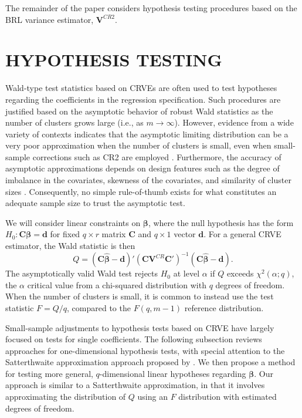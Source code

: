 \documentclass[12pt]{article}\usepackage[]{graphicx}\usepackage[]{color}
\newcommand{\bm}{\mathbf}
\newcommand{\bs}{\boldsymbol}
\begin{document}
The remainder of the paper considers hypothesis testing procedures based on the BRL variance estimator, $\bm{V}^{CR2}$. 


\section{HYPOTHESIS TESTING}
\label{sec:testing}

Wald-type test statistics based on CRVEs are often used to test hypotheses regarding the coefficients in the regression specification. 
Such procedures are justified based on the asymptotic behavior of robust Wald statistics as the number of clusters grows large (i.e., as $m \to \infty$). 
However, evidence from a wide variety of contexts indicates that the asymptotic limiting distribution can be a very poor approximation when the number of clusters is small, even when small-sample corrections such as CR2 are employed \citep{Bell2002bias, Bertrand2004how, Cameron2008bootstrap}. 
Furthermore, the accuracy of asymptotic approximations depends on design features such as the degree of imbalance in the covariates, skewness of the covariates, and similarity of cluster sizes \citep{McCaffrey2001generalizations, Tipton2015small, Webb2013wild}. 
Consequently, no simple rule-of-thumb exists for what constitutes an adequate sample size to trust the asymptotic test. 

We will consider linear constraints on $\bs\beta$, where the null hypothesis has the form $H_0: \bm{C}\bs\beta = \bm{d}$ for fixed $q \times r$ matrix $\bm{C}$ and $q \times 1$ vector $\bm{d}$. 
For a general CRVE estimator, the Wald statistic  is then
\begin{equation}
\label{eq:Wald_stat}
Q = \left(\bm{C}\bs{\hat\beta} - \bm{d}\right)'\left(\bm{C} \bm{V}^{CR} \bm{C}'\right)^{-1}\left(\bm{C}\bs{\hat\beta} - \bm{d}\right).
\end{equation}
The asymptotically valid Wald test rejects $H_0$ at level $\alpha$ if $Q$ exceeds $\chi^2(\alpha; q)$, the $\alpha$ critical value from a chi-squared distribution with $q$ degrees of freedom.  
When the number of clusters is small, it is common to instead use the test statistic $F = Q/q$, compared to the $F(q, m - 1)$ reference distribution. 

Small-sample adjustments to hypothesis tests based on CRVE have largely focused on tests for single coefficients. The following subsection reviews approaches for one-dimensional hypothesis tests, with special attention to the Satterthwaite approximation approach proposed by \citet{Bell2002bias}. 
We then propose a method for testing more general, $q$-dimensional linear hypotheses regarding $\bs\beta$. Our approach is similar to a Satterthwaite approximation, in that it involves approximating the distribution of $Q$ using an $F$ distribution with estimated degrees of freedom. 
\end{document}
